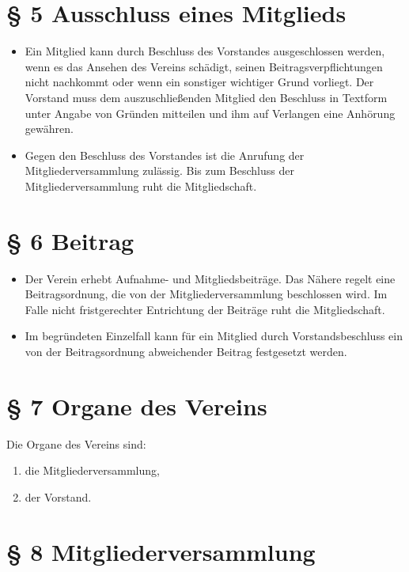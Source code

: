\documentclass[12pt,paper=a4,ngerman]{scrreprt}
\begin{document}
\section{\S{} 5 Ausschluss eines Mitglieds}

\begin{itemize}
\item[(1)]
Ein Mitglied kann durch Beschluss des Vorstandes ausgeschlossen
werden, wenn es das Ansehen des Vereins schädigt, seinen
Beitragsverpflichtungen nicht nachkommt oder wenn ein sonstiger
wichtiger Grund vorliegt. Der Vorstand muss dem auszuschließenden
Mitglied den Beschluss in Textform unter Angabe von Gründen mitteilen
und ihm auf Verlangen eine Anhörung gewähren.
\item[(2)]
Gegen den Beschluss des Vorstandes ist die Anrufung der
Mitgliederversammlung zulässig. Bis zum Beschluss der
Mitgliederversammlung ruht die Mitgliedschaft.
\end{itemize}

\section{\S{} 6 Beitrag}

\begin{itemize}
\item[(1)]
Der Verein erhebt Aufnahme- und Mitgliedsbeiträge. Das Nähere regelt eine
Beitragsordnung, die von der Mitgliederversammlung beschlossen wird.
Im Falle nicht fristgerechter Entrichtung der Beiträge ruht die
Mitgliedschaft.
\item[(2)]
Im begründeten Einzelfall kann für ein Mitglied durch
Vorstandsbeschluss ein von der Beitragsordnung abweichender Beitrag
festgesetzt werden.
\end{itemize}

\section{\S{} 7 Organe des Vereins}

Die Organe des Vereins sind:
\begin{enumerate}
\item
die Mitgliederversammlung,
\item
der Vorstand.
\end{enumerate}

\section{\S{} 8 Mitgliederversammlung}
\end{document}
